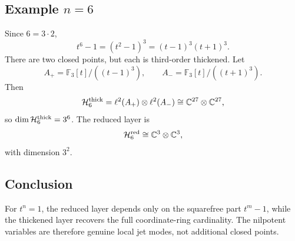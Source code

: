 \subsection{Example \texorpdfstring{\(n=6\)}{n=6}}

Since \(6=3\cdot2\),
\[
  t^6-1=(t^2-1)^3=(t-1)^3(t+1)^3.
\]
There are two closed points, but each is third-order thickened.  Let
\[
  A_+=\mathbb F_3[t]/((t-1)^3),\qquad
  A_-=\mathbb F_3[t]/((t+1)^3).
\]
Then
\[
  \mathcal H_6^{\rm thick}
  =
  \ell^2(A_+)\otimes\ell^2(A_-)
  \cong\mathbb C^{27}\otimes\mathbb C^{27},
\]
so \(\dim\mathcal H_6^{\rm thick}=3^6\).  The reduced layer is
\[
  \mathcal H_6^{\rm red}\cong\mathbb C^3\otimes\mathbb C^3,
\]
with dimension \(3^2\).

\subsection{Conclusion}

For \(t^n=1\), the reduced layer depends only on the squarefree part
\(t^m-1\), while the thickened layer recovers the full coordinate-ring
cardinality.  The nilpotent variables are therefore genuine local jet modes,
not additional closed points.

